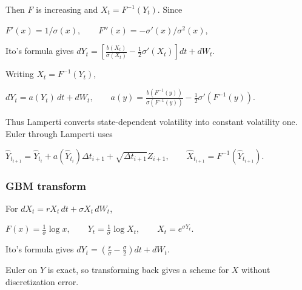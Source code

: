 Then $F$ is increasing and $X_t=F^{-1}(Y_t)$. Since

$F'(x)=1/\sigma(x),\qquad F''(x)=-\sigma'(x)/\sigma^2(x)$,

Ito's formula gives
$dY_t=\left[\frac{b(X_t)}{\sigma(X_t)}-\frac12\sigma'(X_t)\right]dt+dW_t$.

Writing $X_t=F^{-1}(Y_t)$,

$dY_t=a(Y_t)\,dt+dW_t,\qquad a(y)=\frac{b(F^{-1}(y))}{\sigma(F^{-1}(y))}-\frac12\sigma'(F^{-1}(y))$.

Thus Lamperti converts state-dependent volatility into constant volatility one. Euler through Lamperti uses

$\hat Y_{t_{i+1}}=\hat Y_{t_i}+a(\hat Y_{t_i})\Delta t_{i+1}+\sqrt{\Delta t_{i+1}}Z_{i+1},\qquad \hat X_{t_{i+1}}=F^{-1}(\hat Y_{t_{i+1}})$.

\subsubsection*{GBM transform}

For $dX_t=rX_t\,dt+\sigma X_t\,dW_t$,

$F(x)=\frac{1}{\sigma}\log x,\qquad Y_t=\frac{1}{\sigma}\log X_t,\qquad X_t=e^{\sigma Y_t}$.

Ito's formula gives
$dY_t=\left(\frac{r}{\sigma}-\frac{\sigma}{2}\right)dt+dW_t$.

Euler on $Y$ is exact, so transforming back gives a scheme for $X$ without discretization error.









